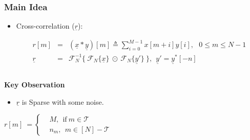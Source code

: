 \documentclass[10pt,xcolor=table]{beamer}
\newcommand{\defeq}{\triangleq}
\newcommand{\xv}{\underline{x}}
\newcommand{\yv}{\underline{y}}
\newcommand{\rv}{\underline{r}}
\begin{document}
\begin{frame}\frametitle{Main Idea}
	\vspace{-0.4cm}
			\begin{block}{}
			
				\begin{itemize}
					\item {Cross-correlation} ($\rv$):
					
                    \begin{eqnarray}
                    \nonumber
					r[m] & = & (\xv*\yv)[m] \defeq \sum_{i=0}^{M-1} x[m+i] y[i], ~ ~ \ 0 \leq m \leq N-1\\
                    \nonumber
					\rv  & = & \mathcal{F}_{N}^{-1} \{~  \mathcal{F}_{N}\{\xv\} ~ \odot ~  \mathcal{F}_{N}\{\yv'\} ~ \}, \ \ \yv' = \yv^{*}[-n]
					\end{eqnarray}					
				\end{itemize}
			\end{block}
			
				\begin{columns}
			\begin{block}{\alert{ \bf Key Observation}}
			\vspace{0.2cm}
				\begin{itemize}
					\item $\rv$ is {\color{blue}Sparse} with some noise.
				\end{itemize}
				 \begin{equation} \label{eqn:RXY_sparse}\nonumber
				 r[m] \ = \left\{
				 \begin{array}{ll}
				 &M,~~  \text{if} \ m \in \mathcal{T} \\
				 & n_m,~~ m \in [N]-\mathcal{T}
				 \end{array}
				 \right.  			
				 \end{equation}
			\end{block}
						
					\begin{figure}
						\centering
						\scalebox{0.35}{}
					\end{figure}
					
				\end{columns}
				
					
\end{frame}
\end{document}
